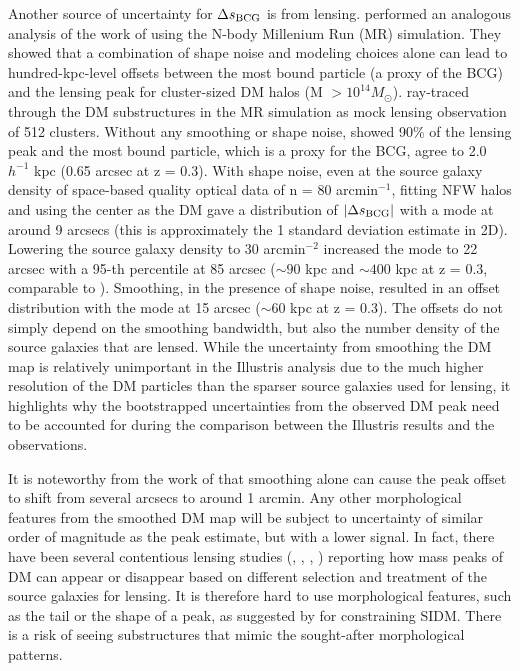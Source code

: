 Another source of uncertainty for $\Delta s_{\rm BCG}$ is from lensing. 
\cite{Dietrich2012} performed an analogous analysis of the work of \cite{Oguri2010} 
using the N-body Millenium Run (MR) simulation.
They showed that a combination of shape noise and modeling choices 
alone can lead to hundred-kpc-level offsets between the most bound particle 
(a proxy of the BCG) and the lensing peak for cluster-sized DM halos 
(M $> 10^{14 }M_\odot$).  
\cite{Dietrich2012} ray-traced through the DM substructures in the MR simulation 
as mock lensing observation of 512 clusters.  
Without any smoothing or shape noise, \cite{Dietrich2012} showed 
90\% of the lensing peak and the 
most bound particle, which is a proxy for the BCG, agree to 2.0 $h^{-1}$ kpc
(0.65 arcsec at z = 0.3). 
With shape noise,
even at the source galaxy density of space-based quality optical data of n = 80
arcmin$^{-1}$, fitting NFW halos and using the center as the DM gave a 
distribution of $|\Delta s_{\rm BCG}|$ with a mode at around 9 arcsecs (this is
approximately the 1 standard deviation estimate in 2D). 
Lowering the source galaxy density to 30 arcmin$^{-2}$ increased the mode
to 22 arcsec with a 95-th percentile at 85 arcsec 
($\sim 90$ kpc and $\sim 400$ kpc at z = 0.3, comparable to \citealt{Oguri2010}). 
Smoothing, in the presence of shape noise,
resulted in an offset distribution with the mode at
15 arcsec ($\sim 60$ kpc at z = 0.3). 
The offsets do not simply depend on the smoothing bandwidth, 
but also the number density of the source galaxies that are lensed. 
While the uncertainty from smoothing the DM map is
relatively unimportant in the Illustris analysis due to the much higher resolution 
of the DM particles than the sparser source galaxies used for lensing, it
highlights why the bootstrapped uncertainties from the observed
DM peak need to be accounted for during the comparison between the
Illustris results and the observations.


It is noteworthy from the work of \cite{Dietrich2012} that 
smoothing alone can cause the peak offset to shift from several arcsecs to
around 1 arcmin.
Any other morphological features from the smoothed DM map will be subject 
to uncertainty of similar order of magnitude as the peak
estimate, but with a lower signal. 
In fact, there have been several contentious lensing studies (\citealt{Clowe2012},
\citealt{Jee2014b}, \citealt{Wittman2014}, \citealt{Cook2012})
reporting how mass peaks of DM can appear or disappear based on
different selection and treatment of the source galaxies for lensing. 
It is therefore hard to use morphological features, such as the tail or the shape 
of a peak,
as suggested by \cite{Kahlhoefer14} for constraining SIDM.
There is a risk of seeing substructures that mimic the sought-after 
morphological patterns. 

